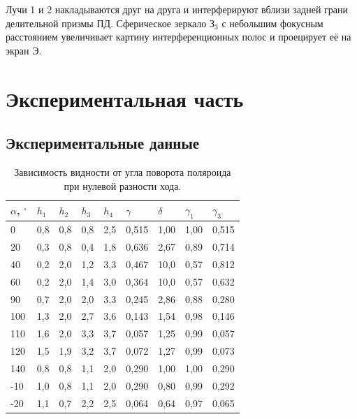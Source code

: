 \documentclass[a4paper,12pt]{article} %
\begin{document}
	Лучи 1 и 2 накладываются друг на друга и интерферируют вблизи задней грани делительной призмы ПД. Сферическое зеркало $З_3$ с небольшим фокусным расстоянием увеличивает картину интерференционных полос и проецирует её на экран Э.
	
\section{Экспериментальная часть}
	\subsection{Экспериментальные данные}
		\begin{table}[H]
			\caption{Зависимость видности от угла поворота поляроида при нулевой разности хода.}
			\label{table:exp1}
			\begin{tabular}{|l|l|l|l|l|l|l|l|l|}
				\hline
				$ \alpha $, $ ^\circ $ & $ h_1 $  & $ h_2 $  & $ h_3 $  & $ h_4 $  & $ \gamma $     & $ \delta $    & $ \gamma_1 $   & $ \gamma_3 $   \\ \hline
				0    & 0,8 & 0,8 & 0,8 & 2,5 & 0,515 & 1,00  & 1,00 & 0,515 \\ \hline
				20   & 0,3 & 0,8 & 0,4 & 1,8 & 0,636 & 2,67  & 0,89 & 0,714 \\ \hline
				40   & 0,2 & 2,0   & 1,2 & 3,3 & 0,467 & 10,0 & 0,57 & 0,812 \\ \hline
				60   & 0,2 & 2,0   & 1,4 & 3,0   & 0,364 & 10,0 & 0,57 & 0,632 \\ \hline
				90   & 0,7 & 2,0   & 2,0   & 3,3 & 0,245 & 2,86  & 0,88 & 0,280 \\ \hline
				100  & 1,3 & 2,0   & 2,7 & 3,6 & 0,143 & 1,54  & 0,98 & 0,146 \\ \hline
				110  & 1,6 & 2,0   & 3,3 & 3,7 & 0,057 & 1,25  & 0,99 & 0,057 \\ \hline
				120  & 1,5 & 1,9 & 3,2 & 3,7 & 0,072 & 1,27  & 0,99 & 0,073 \\ \hline
				140  & 0,8 & 0,8 & 1,1 & 2,0   & 0,290 & 1,00  & 1,00 & 0,290 \\ \hline
				-10  & 1,0   & 0,8 & 1,1 & 2,0   & 0,290 & 0,80  & 0,99 & 0,292 \\ \hline
				-20  & 1,1 & 0,7 & 2,2 & 2,5 & 0,064 & 0,64  & 0,97 & 0,065 \\ \hline
			\end{tabular}
		\end{table}
		
\end{document}

